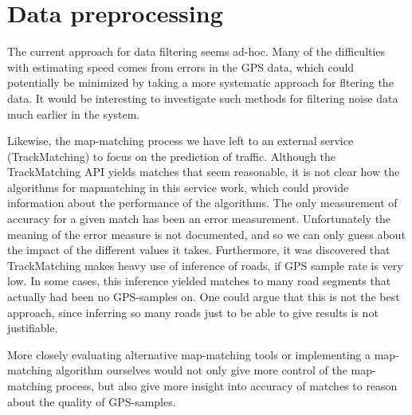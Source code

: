 \section{Data preprocessing}
The current approach for data filtering seems ad-hoc. Many of the difficulties with estimating speed comes from errors in the GPS data, which could potentially be minimized by taking a more systematic approach for fltering the data. It would be interesting to investigate such methods for filtering noise data much earlier in the system.

Likewise, the map-matching process we have left to an external service (TrackMatching) to focus on the prediction of traffic. Although the TrackMatching API yields matches that seem reasonable, it is not clear how the algorithms for mapmatching in this service work, which could provide information about the performance of the algorithms. The only measurement of accuracy for a given match has been an error measurement. Unfortunately the meaning of the error measure is not documented, and so we can only guess about the impact of the different values it takes. Furthermore, it was discovered that TrackMatching makes heavy use of inference of roads, if GPS sample rate is very low. In some cases, this inference yielded matches to many road segments that actually had been no GPS-samples on. One could argue that this is not the best approach, since inferring so many roads just to be able to give results is not justifiable.

More closely evaluating alternative map-matching tools or implementing a map-matching algorithm ourselves would not only give more control of the map-matching process, but also give more insight into accuracy of matches to reason about the quality of GPS-samples.


